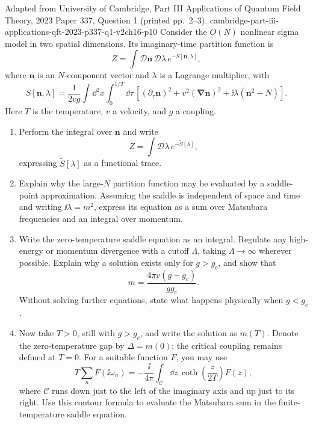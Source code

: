 \begin{enumerate}
  {Adapted from University of Cambridge, Part III Applications of Quantum
  Field Theory, 2023 Paper 337, Question 1 (printed pp.~2--3).}
  {cambridge-part-iii-applications-qft-2023-p337-q1-v2ch16-p10}
  Consider the \(O(N)\) nonlinear sigma model in two spatial dimensions.  Its
  imaginary-time partition function is
  \[
    Z=\int\mathcal D\mathbf n\,\mathcal D\lambda\,e^{-S[\mathbf n,\lambda]},
  \]
  where \(\mathbf n\) is an \(N\)-component vector and \(\lambda\) is a
  Lagrange multiplier, with
  \[
    S[\mathbf n,\lambda]
      =\frac1{2vg}\int \dd^2x\int_0^{1/T}\dd\tau\,
        \left[(\partial_\tau\mathbf n)^2
          +v^2(\boldsymbol\nabla\mathbf n)^2
          +\ii\lambda(\mathbf n^2-N)\right].
  \]
  Here \(T\) is the temperature, \(v\) a velocity, and \(g\) a coupling.
  \begin{enumerate}
    \item[(a)]
    Perform the integral over \(\mathbf n\) and write
    \[
      Z=\int\mathcal D\lambda\,e^{-\widetilde S[\lambda]},
    \]
    expressing \(\widetilde S[\lambda]\) as a functional trace.
    \item[(b)]
    Explain why the large-\(N\) partition function may be evaluated by a
    saddle-point approximation.  Assuming the saddle is independent of
    space and time and writing \(\ii\lambda=m^2\), express its equation as a
    sum over Matsubara frequencies and an integral over momentum.
    \item[(c)]
    Write the zero-temperature saddle equation as an integral.  Regulate any
    high-energy or momentum divergence with a cutoff \(\Lambda\), taking
    \(\Lambda\to\infty\) wherever possible.  Explain why a solution exists
    only for \(g>g_c\), and show that
    \[
      m=\frac{4\pi v(g-g_c)}{gg_c}.
    \]
    Without solving further equations, state what happens physically when
    \(g<g_c\).
    \item[(d)]
    Now take \(T>0\), still with \(g>g_c\), and write the solution as
    \(m(T)\).  Denote the zero-temperature gap by \(\Delta=m(0)\); the
    critical coupling remains defined at \(T=0\).  For a suitable function
    \(F\), you may use
    \[
      T\sum_n F(\ii\omega_n)
        =-\frac{\ii}{4\pi}\int_{\mathcal C}\dd z\,
          \coth\!\left(\frac z{2T}\right)F(z),
    \]
    where \(\mathcal C\) runs down just to the left of the imaginary axis
    and up just to its right.  Use this contour formula to evaluate the
    Matsubara sum in the finite-temperature saddle equation.

\end{enumerate}
\end{enumerate}
